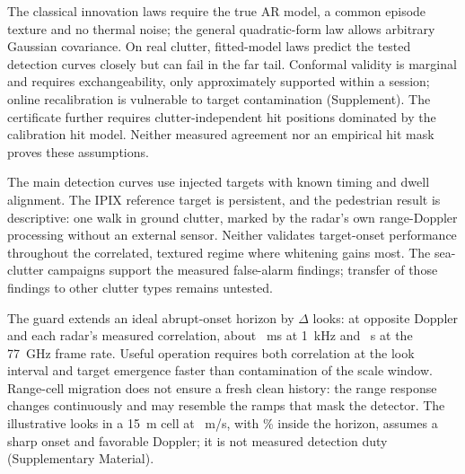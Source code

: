 \documentclass[journal]{IEEEtran}
\begin{document}
The classical innovation laws require the true AR model, a common episode texture and no thermal noise; the general quadratic-form law allows arbitrary Gaussian covariance. On real clutter, fitted-model laws predict the tested detection curves closely but can fail in the far tail. Conformal validity is marginal and requires exchangeability, only approximately supported within a session; online recalibration is vulnerable to target contamination (Supplement). The certificate further requires clutter-independent hit positions dominated by the calibration hit model. Neither measured agreement nor an empirical hit mask proves these assumptions.

The main detection curves use injected targets with known timing and dwell alignment. The IPIX reference target is persistent, and the pedestrian result is descriptive: one walk in ground clutter, marked by the radar's own range-Doppler processing without an external sensor. Neither validates target-onset performance throughout the correlated, textured regime where whitening gains most. The sea-clutter campaigns support the measured false-alarm findings; transfer of those findings to other clutter types remains untested.

The guard extends an ideal abrupt-onset horizon by $\Delta$ looks: at opposite Doppler and each radar's measured correlation, about \HorizMsPrf~ms at 1~kHz and \HorizSecFrame~s at the 77~GHz frame rate. Useful operation requires both correlation at the look interval and target emergence faster than contamination of the scale window. Range-cell migration does not ensure a fresh clean history: the range response changes continuously and may resemble the ramps that mask the detector. The illustrative \CellLooksRef{} looks in a 15~m cell at \CellSpeedRef~m/s, with \DutyRef\% inside the horizon, assumes a sharp onset and favorable Doppler; it is not measured detection duty (Supplementary Material).
\end{document}
